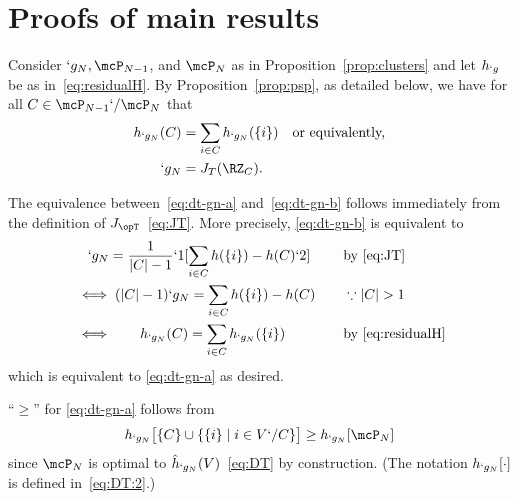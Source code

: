 \section{Proofs of main results}
 \label{sec:proof}
 
\begin{Proof}
	Consider $`g_N,\mcP_{N-1}$, and $\mcP_{N}$ as in Proposition~\ref{prop:clusters} and let $h_{`g}$
	be as in~\eqref{eq:residualH}.
	By Proposition~\ref{prop:psp},
	as detailed below, we have for all $C\in \mcP_{N-1}`/\mcP_{N}$ that 
	\begin{subequations}
		\begin{align}
			h_{`g_{N}}(C)&=\sum_{i\in C}h_{`g_{N}}(\Set{i}) \kern1em \text{or equivalently,}
			\label{eq:dt-gn-a}
			\\
			`g_{N}&=J_{T}(\RZ_C).
			\label{eq:dt-gn-b}
		\end{align}
	\end{subequations}
\begin{compactitem}

	\item  The equivalence between~\eqref{eq:dt-gn-a} and~\eqref{eq:dt-gn-b} follows immediately from
		the definition of $J_{\opT}$~\eqref{eq:JT}. More precisely, \eqref{eq:dt-gn-b} is equivalent to
	\begin{alignat*}{2}
	&\kern1em `g_N  =\frac1 {\abs{C}-1}`1[\sum_{i \in C}h(\Set {i})- h(C)`2] &\kern1em &\text {by \eqref{eq:JT}} \\
	&\iff (\abs{C}-1) `g_N = \sum_{i \in C} h(\Set {i})- h(C) & & \because \abs {C}>1\\
	&\iff \kern1.8em h_{`g_N}(C) = \sum_{i \in C} h_{`g_N}(\Set {i}) && \text {by \eqref{eq:residualH}}
	\end{alignat*}
	which is equivalent to \eqref{eq:dt-gn-a} as desired.

	\item ``$\geq$'' for \eqref{eq:dt-gn-a}
	follows from 
	\begin{align*}
	h_{`g_{N}}\big[\Set{C}\cup\Set{\Set{i}\mid i\in V`/C}\big]
	\geq
	h_{`g_{N}}[\mcP_N]
	\end{align*}
	since $\mcP_N$ is optimal to $\hat{h}_{`g_{N}}(V)$~\eqref{eq:DT} by construction.
	(The notation $h_{`g_{N}}[\cdot]$ is defined in~\eqref{eq:DT:2}.)


\end{compactitem}
\end{Proof}

